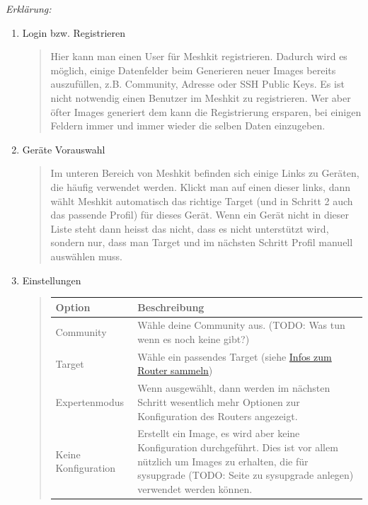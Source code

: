 \documentclass[a4paper,12pt,ngerman]{sphinxmanual}
\begin{document}
\emph{Erklärung:}
\begin{enumerate}
\item {} 
Login bzw. Registrieren
\begin{quote}

Hier kann man einen User für Meshkit registrieren. Dadurch wird es möglich,
einige Datenfelder beim Generieren neuer Images bereits auszufüllen, z.B.
Community, Adresse oder SSH Public Keys. Es ist nicht notwendig einen Benutzer
im Meshkit zu registrieren. Wer aber öfter Images generiert dem kann
die Registrierung ersparen, bei einigen Feldern immer und immer wieder die
selben Daten einzugeben.
\end{quote}

\item {} 
Geräte Vorauswahl
\begin{quote}

Im unteren Bereich von Meshkit befinden sich einige Links zu Geräten, die
häufig verwendet werden. Klickt man auf einen dieser links, dann wählt Meshkit
automatisch das richtige Target (und in Schritt 2 auch das passende Profil) für
dieses Gerät. Wenn ein Gerät nicht in dieser Liste steht dann heisst das nicht,
dass es nicht unterstützt wird, sondern nur, dass man Target und im nächsten
Schritt Profil manuell auswählen muss.
\end{quote}

\item {} 
Einstellungen
\begin{quote}

\begin{center}\begin{tabulary}{\linewidth}{|L|L|}
\hline
\textbf{\relax 
Option
} & \textbf{\relax 
Beschreibung
}\\\hline

Community
 & 
Wähle deine Community aus. (TODO: Was tun wenn es noch keine gibt?)
\\\hline

Target
 & 
Wähle ein passendes Target (siehe {\hyperref[generate:infos-zum-router-sammeln]{Infos zum Router sammeln}})
\\\hline

Expertenmodus
 & 
Wenn ausgewählt, dann werden im nächsten Schritt wesentlich mehr Optionen
zur Konfiguration des Routers angezeigt.
\\\hline

Keine Konfiguration
 & 
Erstellt ein Image, es wird aber keine Konfiguration durchgeführt. Dies
ist vor allem nützlich um Images zu erhalten, die für sysupgrade (TODO:
Seite zu sysupgrade anlegen) verwendet werden können.
\\\hline


\end{tabulary}
\end{center}
\end{quote}
\end{enumerate}
\end{document}
